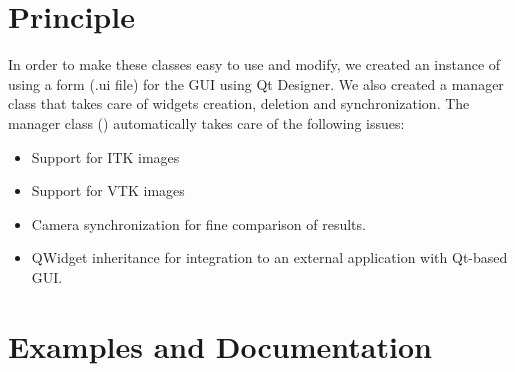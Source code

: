 \documentclass{InsightArticle}
\begin{document}
\section{Principle}
In order to make these classes easy to use and modify, we created an instance of
 using a form (.ui file) for the GUI using Qt Designer. We also
created a manager class that takes care of widgets creation, deletion and
synchronization. The manager class () automatically takes care of
the following issues:
\begin{itemize}
  \item Support for ITK images
  \item Support for VTK images
  \item Camera synchronization for fine comparison of results.
  \item QWidget inheritance for integration to an external application with
Qt-based GUI.
\end{itemize}


\section{Examples and Documentation}
\end{document}
